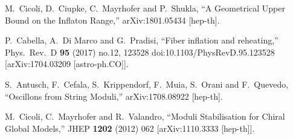 \documentclass[11pt,a4paper]{article}
\begin{document}
\begin{thebibliography}{99}
  M.~Cicoli, D.~Ciupke, C.~Mayrhofer and P.~Shukla,
  ``A Geometrical Upper Bound on the Inflaton Range,''
  arXiv:1801.05434 [hep-th].
	
  P.~Cabella, A.~Di Marco and G.~Pradisi,
  ``Fiber inflation and reheating,''
  Phys.\ Rev.\ D {\bf 95} (2017) no.12,  123528
  doi:10.1103/PhysRevD.95.123528
  [arXiv:1704.03209 [astro-ph.CO]].	
	
  S.~Antusch, F.~Cefala, S.~Krippendorf, F.~Muia, S.~Orani and F.~Quevedo,
  ``Oscillons from String Moduli,''
  arXiv:1708.08922 [hep-th].

  M.~Cicoli, C.~Mayrhofer and R.~Valandro,
  ``Moduli Stabilisation for Chiral Global Models,''
  JHEP {\bf 1202} (2012) 062
  [arXiv:1110.3333 [hep-th]].

\end{thebibliography}
\end{document}
